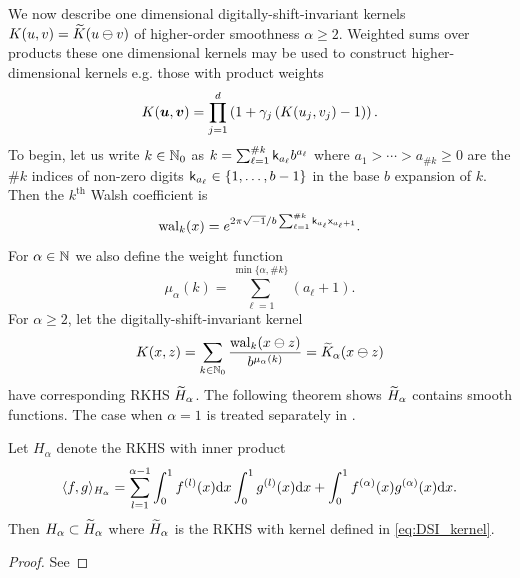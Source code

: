 \documentclass[acmsmall]{acmart}
\begin{document}
We now describe one dimensional digitally-shift-invariant kernels $K(u,v) = {\widetilde{K}}(u \ominus v)$ of higher-order smoothness $\alpha \geq 2$. Weighted sums over products these one dimensional kernels may be used to construct higher-dimensional kernels e.g. those with product weights 
$$K({\boldsymbol{u}},{\boldsymbol{v}}) = \prod_{j=1}^d \left(1+\gamma_j  \left(K(u_j,v_j)-1\right)\right).$$
To begin, let us write $k \in {\mathbb{N}}_0$ as $k = \sum_{\ell=1}^{\#k} {\mathsf{k}}_{a_\ell} b^{a_\ell}$ where $a_1 > \cdots > a_{\#k} \geq 0$ are the $\#k$ indices of non-zero digits ${\mathsf{k}}_{a_\ell} \in \{1,\dots,b-1\}$ in the base $b$ expansion of $k$. Then the $k^\mathrm{th}$ Walsh coefficient is 
$$\mathrm{wal}_k(x) = e^{2 \pi \sqrt{-1}/b \sum_{\ell=1}^{\#k} {\mathsf{k}}_{a_\ell} {\mathsf{x}}_{a_\ell+1}}.$$ 
For $\alpha \in {\mathbb{N}}$ we also define the weight function 
$$\mu_\alpha(k) = \sum_{\ell=1}^{\min\{\alpha,\#k\}} (a_\ell+1).$$
For $\alpha \geq 2$, let the digitally-shift-invariant kernel 
\begin{equation}
    K(x,z) = \sum_{k \in {\mathbb{N}}_0} \frac{\mathrm{wal}_k(x \ominus z)}{b^{\mu_\alpha(k)}} = {\widetilde{K}}_\alpha(x \ominus z)
    \label{eq:DSI_kernel}
\end{equation}
have corresponding RKHS ${\widetilde{H}}_\alpha$. The following theorem shows ${\widetilde{H}}_\alpha$ contains smooth functions. The case when $\alpha=1$ is treated separately in \citep{dick.multivariate_integraion_sobolev_spaces_digital_nets}.   
\begin{theorem} \label{thm:RKHS_DSI_contain}
    Let $H_\alpha$ denote the RKHS with inner product 
    $$\langle f,g \rangle_{H_\alpha} =\sum_{l=1}^{\alpha-1} \int_0^1 f^{(l)}(x) \mathrm{d} x \int_0^1 g^{(l)}(x) \mathrm{d} x + \int_0^1 f^{(\alpha)}(x) g^{(\alpha)}(x) \mathrm{d} x.$$
    Then $H_\alpha \subset {\widetilde{H}}_\alpha$ where ${\widetilde{H}}_\alpha$ is the RKHS with kernel defined in \cref{eq:DSI_kernel}.
\end{theorem}
\begin{proof} 
    See 
\end{proof}
\end{document}
